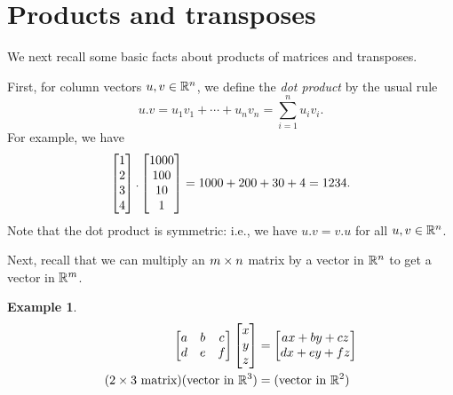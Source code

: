\documentclass[reqno]{amsart}
\theoremstyle{definition}
\newtheorem{example}[theorem]{Example}
\newcommand{\dfn}[1]{\emph{{#1}}\index{#1}}
\begin{document}
\section{Products and transposes}
\label{sec-products}

We next recall some basic facts about products of matrices and
transposes.

First, for column vectors $u,v\in{\mathbb{R}}^n$, we define the \dfn{dot
 product} by the usual rule
\[ u.v = u_1v_1 + \dotsb + u_nv_n = \sum_{i=1}^n u_iv_i. \]
For example, we have
\[ \left[\begin{matrix} 1 \\ 2 \\ 3 \\ 4 \end{matrix}\right] .
   \left[\begin{matrix} 1000 \\ 100 \\ 10 \\ 1 \end{matrix}\right] =
    1000 + 200 + 30 + 4 = 1234.
\]
Note that the dot product is symmetric: i.e., we have $u.v=v.u$
for all $u,v\in{\mathbb{R}}^n$.

Next, recall that we can multiply an $m\times n$ matrix by a vector in
${\mathbb{R}}^n$ to get a vector in ${\mathbb{R}}^m$.  
\begin{example}\label{eg-At-i}
 \begin{align*}
  \left[\begin{matrix} a & b & c \\ d & e & f \end{matrix}\right] \left[\begin{matrix} x \\ y \\ z \end{matrix}\right] &= 
     \left[\begin{matrix} ax+by+cz \\ dx+ey+fz \end{matrix}\right] \\
  \text{($2\times 3$ matrix)}\text{(vector in ${\mathbb{R}}^3$)}
   &= \text{(vector in ${\mathbb{R}}^2$)}
 \end{align*}
\end{example}
\end{document}

